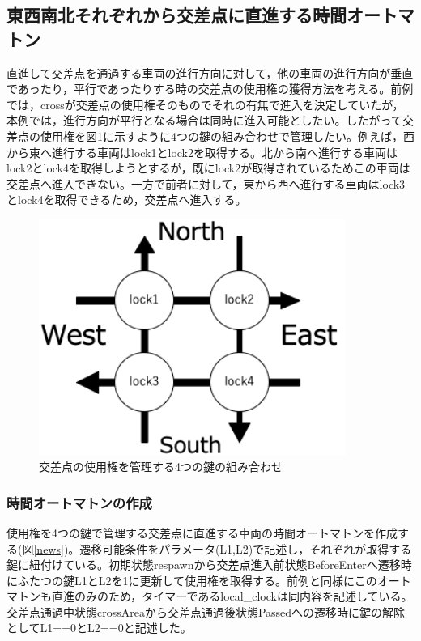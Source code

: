 \documentclass{tpu-sotu}
\begin{document}
	
	\subsection{東西南北それぞれから交差点に直進する時間オートマトン}
	直進して交差点を通過する車両の進行方向に対して，他の車両の進行方向が垂直であったり，平行であったりする時の交差点の使用権の獲得方法を考える。前例では，crossが交差点の使用権そのものでそれの有無で進入を決定していたが，本例では，進行方向が平行となる場合は同時に進入可能としたい。したがって交差点の使用権を図\ref{oTWoL}に示すように4つの鍵の組み合わせで管理したい。例えば，西から東へ進行する車両はlock1とlock2を取得する。北から南へ進行する車両はlock2とlock4を取得しようとするが，既にlock2が取得されているためこの車両は交差点へ進入できない。一方で前者に対して，東から西へ進行する車両はlock3とlock4を取得できるため，交差点へ進入する。
	\begin{figure}[htbp]
	\centering
	\includegraphics[width=100mm]{onTheWayofLock.png}
	\caption{交差点の使用権を管理する4つの鍵の組み合わせ}
	\label{oTWoL}
	\end{figure}
	\subsubsection{時間オートマトンの作成}
	使用権を4つの鍵で管理する交差点に直進する車両の時間オートマトンを作成する(図\ref{news})。遷移可能条件をパラメータ(L1,L2)で記述し，それぞれが取得する鍵に紐付けている。初期状態respawnから交差点進入前状態BeforeEnterへ遷移時にふたつの鍵L1とL2を1に更新して使用権を取得する。前例と同様にこのオートマトンも直進のみのため，タイマーであるlocal\_clockは同内容を記述している。交差点通過中状態crossAreaから交差点通過後状態Passedへの遷移時に鍵の解除としてL1==0とL2==0と記述した。
	
\end{document}
